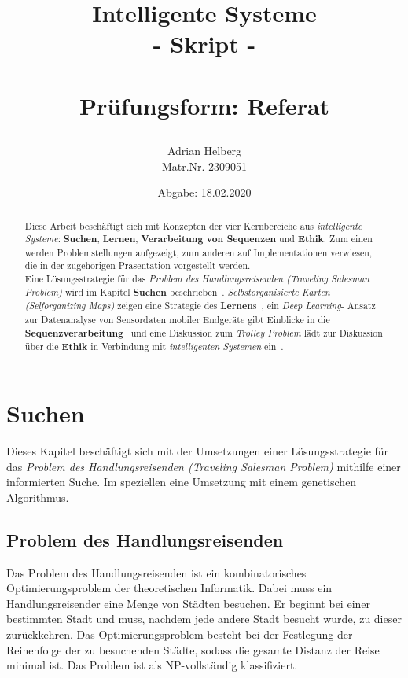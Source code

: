 \documentclass[11pt]{article}
\title{
    \begin{center}
        \Huge \textbf{Intelligente Systeme}\\
        {\color{blue}- Skript -}\\~\\
        \Large Prüfungsform: Referat
    \end{center}
}
\author{Adrian Helberg\\ Matr.Nr. 2309051}
\date{Abgabe: 18.02.2020}
\begin{document}
    \maketitle

    \begin{abstract}
        Diese Arbeit beschäftigt sich mit Konzepten der vier Kernbereiche aus \textit{intelligente
        Systeme}: \textbf{Suchen}, \textbf{Lernen}, \textbf{Verarbeitung von Sequenzen} und
        \textbf{Ethik}. Zum einen werden Problemstellungen aufgezeigt, zum anderen auf
        Implementationen verwiesen, die in der zugehörigen Präsentation vorgestellt werden.\\ Eine
        Lösungsstrategie für das \textit{Problem des Handlungsreisenden (Traveling Salesman
        Problem)} wird im Kapitel \textbf{Suchen} beschrieben~\cite{suchen, salesman, impl}.
        \textit{Selbstorganisierte Karten (Selforganizing Maps)} zeigen eine Strategie des \textbf{Lernen}s~\cite{lernen, som},
        ein \textit{Deep Learning}- Ansatz zur Datenanalyse von Sensordaten mobiler Endgeräte gibt Einblicke in
        die \textbf{Sequenzverarbeitung}~\cite{sequenzen} und eine Diskussion zum \textit{Trolley Problem} lädt
        zur Diskussion über die \textbf{Ethik} in Verbindung mit \textit{intelligenten Systemen}
        ein~\cite{trolley, Eimler2018}.
    \end{abstract}

    \tableofcontents
    \newpage

    \section{Suchen}

    Dieses Kapitel beschäftigt sich mit der Umsetzungen einer Lösungsstrategie für das
    \textit{Problem des Handlungsreisenden (Traveling Salesman Problem)} mithilfe einer
    informierten Suche. Im speziellen eine Umsetzung mit einem genetischen Algorithmus.

    \subsection{Problem des Handlungsreisenden}
    Das Problem des Handlungsreisenden ist ein kombinatorisches Optimierungsproblem der
    theoretischen Informatik. Dabei muss ein Handlungsreisender eine Menge von Städten besuchen.
    Er beginnt bei einer bestimmten Stadt und muss, nachdem jede andere Stadt besucht wurde, zu
    dieser zurückkehren. Das Optimierungsproblem besteht bei der Festlegung der Reihenfolge der zu
    besuchenden Städte, sodass die gesamte Distanz der Reise minimal ist. Das Problem ist als
    NP-vollständig klassifiziert.
\end{document}
